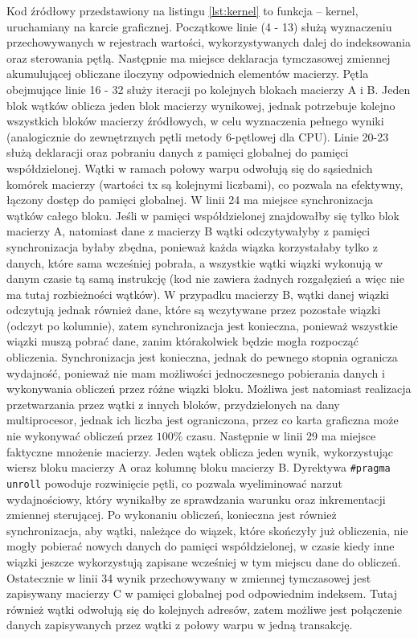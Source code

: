 \documentclass[12pt,a4paper]{article}
\begin{document}
\newpage
Kod źródłowy przedstawiony na listingu \ref{lst:kernel} to funkcja -- kernel, uruchamiany na karcie graficznej. Początkowe linie (4 - 13) służą wyznaczeniu przechowywanych w rejestrach wartości, wykorzystywanych dalej do indeksowania oraz sterowania pętlą. Następnie ma miejsce deklaracja tymczasowej zmiennej akumulującej obliczane iloczyny odpowiednich elementów macierzy. Pętla obejmujące linie 16 - 32 służy iteracji po kolejnych blokach macierzy A i B. Jeden blok wątków oblicza jeden blok macierzy wynikowej, jednak potrzebuje kolejno wszystkich bloków macierzy źródłowych, w celu wyznaczenia pełnego wyniki (analogicznie do zewnętrznych pętli metody 6-pętlowej dla CPU).
Linie 20-23 służą deklaracji oraz pobraniu danych z pamięci globalnej do pamięci współdzielonej. Wątki w ramach połowy warpu odwołują się do sąsiednich komórek macierzy (wartości tx są kolejnymi liczbami), co pozwala na efektywny, łączony dostęp do pamięci globalnej. W linii 24 ma miejsce synchronizacja wątków całego bloku. Jeśli w pamięci współdzielonej znajdowałby się tylko blok macierzy A, natomiast dane z macierzy B wątki odczytywałyby z pamięci synchronizacja byłaby zbędna, ponieważ każda wiązka korzystałaby tylko z danych, które sama wcześniej pobrała, a wszystkie wątki wiązki wykonują w danym czasie tą samą instrukcję (kod nie zawiera żadnych rozgałęzień a więc nie ma tutaj rozbieżności wątków). W przypadku macierzy B, wątki danej wiązki odczytują jednak również dane, które są wczytywane przez pozostałe wiązki (odczyt po kolumnie), zatem synchronizacja jest konieczna, ponieważ wszystkie wiązki muszą pobrać dane, zanim którakolwiek będzie mogła rozpocząć obliczenia. Synchronizacja jest konieczna, jednak do pewnego stopnia ogranicza wydajność, ponieważ nie mam możliwości jednoczesnego pobierania danych i wykonywania obliczeń przez różne wiązki bloku. Możliwa jest natomiast realizacja przetwarzania przez wątki z innych bloków, przydzielonych na dany multiprocesor, jednak ich liczba jest ograniczona, przez co karta graficzna może nie wykonywać obliczeń przez $100\%$ czasu.
Następnie w linii 29 ma miejsce faktyczne mnożenie macierzy. Jeden wątek oblicza jeden wynik, wykorzystując wiersz bloku macierzy A oraz kolumnę bloku macierzy B. Dyrektywa \verb|#pragma unroll| powoduje rozwinięcie pętli, co pozwala wyeliminować narzut wydajnościowy, który wynikałby ze sprawdzania warunku oraz inkrementacji zmiennej sterującej.
Po wykonaniu obliczeń, konieczna jest również synchronizacja, aby wątki, należące do wiązek, które skończyły już obliczenia, nie mogły pobierać nowych danych do pamięci współdzielonej, w czasie kiedy inne wiązki jeszcze wykorzystują zapisane wcześniej w tym miejscu dane do obliczeń. Ostatecznie w linii 34 wynik przechowywany w zmiennej tymczasowej jest zapisywany macierzy C w pamięci globalnej pod odpowiednim indeksem. Tutaj również wątki odwołują się do kolejnych adresów, zatem możliwe jest połączenie danych zapisywanych przez wątki z połowy warpu w jedną transakcję.\\
\end{document}
